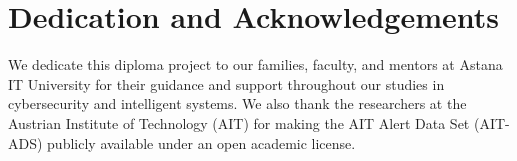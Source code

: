 \chapter{Dedication and Acknowledgements}
\begin{SingleSpace}

We dedicate this diploma project to our families, faculty, and mentors at Astana IT University for their guidance and support throughout our studies in cybersecurity and intelligent systems. We also thank the researchers at the Austrian Institute of Technology (AIT) for making the AIT Alert Data Set (AIT-ADS) publicly available under an open academic license.

\end{SingleSpace}
\clearpage
